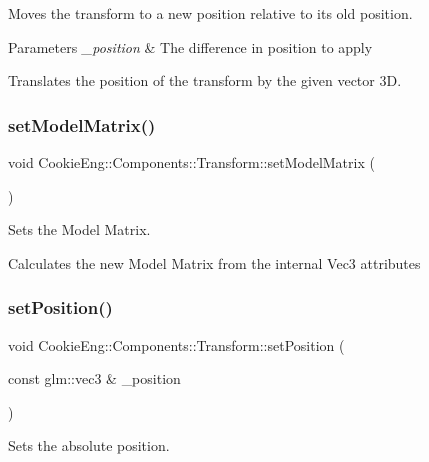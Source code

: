 Moves the transform to a new position relative to its old position. 


\begin{DoxyParams}{Parameters}
{\em \+\_\+position} & The difference in position to apply\\
\hline
\end{DoxyParams}
Translates the position of the transform by the given vector 3D. \mbox{\label{class_cookie_eng_1_1_components_1_1_transform_a169960289f66442f692bb52c4c86478e}} 
\subsubsection{\texorpdfstring{set\+Model\+Matrix()}{setModelMatrix()}}
{\footnotesize\ttfamily void Cookie\+Eng\+::\+Components\+::\+Transform\+::set\+Model\+Matrix (\begin{DoxyParamCaption}{ }\end{DoxyParamCaption})}



Sets the Model Matrix. 

Calculates the new Model Matrix from the internal Vec3 attributes \mbox{\label{class_cookie_eng_1_1_components_1_1_transform_ac20843bb62dfdf7fce9fa96368b5a807}} 
\subsubsection{\texorpdfstring{set\+Position()}{setPosition()}}
{\footnotesize\ttfamily void Cookie\+Eng\+::\+Components\+::\+Transform\+::set\+Position (\begin{DoxyParamCaption}\item[{const glm\+::vec3 \&}]{\+\_\+position }\end{DoxyParamCaption})}



Sets the absolute position. 


